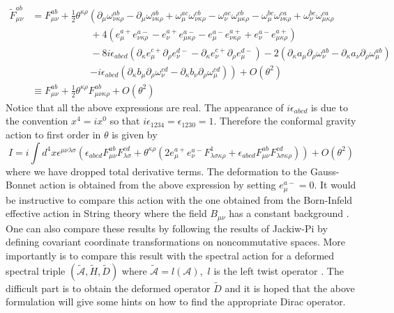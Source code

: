 \documentclass[a4paper,a4paper]{article}
\begin{document}
\begin{align*}
\widetilde{F}_{\mu\nu}^{ab}  &  =F_{\mu\nu}^{ab}+\frac{1}{2}\theta^{\kappa
\rho}\left(  \partial_{\mu}\omega_{\nu\kappa\rho}^{ab}-\partial_{\mu}%
\omega_{\nu\kappa\rho}^{ab}+\omega_{\mu}^{ac}\omega_{\nu\kappa\rho}%
^{cb}-\omega_{\nu}^{ac}\omega_{\mu\kappa\rho}^{cb}-\omega_{\mu}^{bc}%
\omega_{\nu\kappa\rho}^{ca}+\omega_{\nu}^{bc}\omega_{\mu\kappa\rho}%
^{ca}\right. \\
&  \qquad\qquad\qquad+4\left(  e_{\mu}^{a+}e_{\nu\kappa\rho}^{a-}-e_{\nu}%
^{a+}e_{\mu\kappa\rho}^{a-}-e_{\mu}^{a-}e_{\nu\kappa\rho}^{a+}+e_{\nu}%
^{a-}e_{\mu\kappa\rho}^{a+}\right) \\
&  \qquad\qquad\qquad-8i\epsilon_{abcd}\left(  \partial_{\kappa}e_{\mu}%
^{c+}\partial_{\rho}e_{\nu}^{d-}-\partial_{\kappa}e_{\nu}^{c+}\partial_{\rho
}e_{\mu}^{d-}\right)  -2\left(  \partial_{\kappa}a_{\mu}\partial_{\rho}%
\omega_{\nu}^{ab}-\partial_{\kappa}a_{\nu}\partial_{\rho}\omega_{\mu}%
^{ab}\right) \\
&  \qquad\qquad\qquad\left.  -i\epsilon_{abcd}\left(  \partial_{\kappa}b_{\mu
}\partial_{\rho}\omega_{\nu}^{cd}-\partial_{\kappa}b_{\nu}\partial_{\rho
}\omega_{\mu}^{cd}\right)  \right)  +O(\theta^{2})\\
&  \equiv F_{\mu\nu}^{ab}+\frac{1}{2}\theta^{\kappa\rho}F_{\mu\nu\kappa\rho
}^{ab}+O(\theta^{2})
\end{align*}
Notice that all the above expressions are real. The appearance of
$i\epsilon_{abcd}$ is due to the convention $x^{4}=ix^{0}$ so that
$i\epsilon_{1234}=\epsilon_{1230}=1.$ Therefore the conformal gravity action
to first order in $\theta$ is given by
\[
I=i\int d^{4}x\epsilon^{\mu\nu\lambda\sigma}\left(  \epsilon_{abcd}F_{\mu\nu
}^{ab}F_{\lambda\sigma}^{cd}+\theta^{\kappa\rho}\left(  2e_{\mu}^{a+}e_{\nu
}^{a-}F_{\lambda\sigma\kappa\rho}^{1}+\epsilon_{abcd}F_{\mu\nu}^{ab}%
F_{\lambda\sigma\kappa\rho}^{cd}\right)  \right)  +O(\theta^{2})
\]
where we have dropped total derivative terms. The deformation to the
Gauss-Bonnet action is obtained from the above expression by setting $e_{\mu
}^{a-}=0.$ It would be instructive to compare this action with the one
obtained from the Born-Infeld effective action in String theory where the
field $B_{\mu\nu}$ has a constant background \cite{SL}. One can also compare
these results by following the results of Jackiw-Pi \cite{JP} by defining
covariant coordinate transformations on noncommutative spaces. More
importantly is to compare this result with the spectral action for a deformed
spectral triple $(\widetilde{\mathcal{A}},\widetilde{H},\widetilde{D})$ where
$\widetilde{\mathcal{A}}=l(\mathcal{A}),$ $l$ is the left twist operator
\cite{CL}. The difficult part is to obtain the deformed operator
$\widetilde{D}$ and it is hoped that the above formulation will give some
hints on how to find the appropriate Dirac operator.
\end{document}
